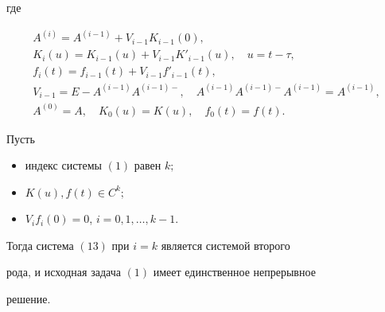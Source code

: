 где 


\begin{gather*} 


A^{(i)}=A^{(i-1)}+V_{i-1}K_{i-1}(0),\\ 


K_i(u)=K_{i-1}(u)+V_{i-1}K'_{i-1}(u),\quad u=t-\tau,\\ 


f_i(t)=f_{i-1}(t)+V_{i-1}f'_{i-1}(t),\\ 


V_{i-1}=E-A^{(i-1)}A^{(i-1)-},\quad 


A^{(i-1)}A^{(i-1)-}A^{(i-1)}=A^{(i-1)}, \\ 


A^{(0)}=A,\quad K_0(u)=K(u),\quad f_0(t)=f(t). 


\end{gather*} 


 


\begin{thm} Пусть 


\begin{itemize} 


\item[1)] индекс системы $(1)$ равен $k;$ 


\item[2)] $K(u),f(t)\in C^k;$ 


\item[3)] $V_i f_i(0)=0$, $i=0,1,\dotsc,k-1$. 


\end{itemize} 


Тогда система $(13)$ при $i=k$ является системой второго 


рода, и исходная задача $(1)$ имеет единственное непрерывное 


решение. 


\end{thm} 


 


